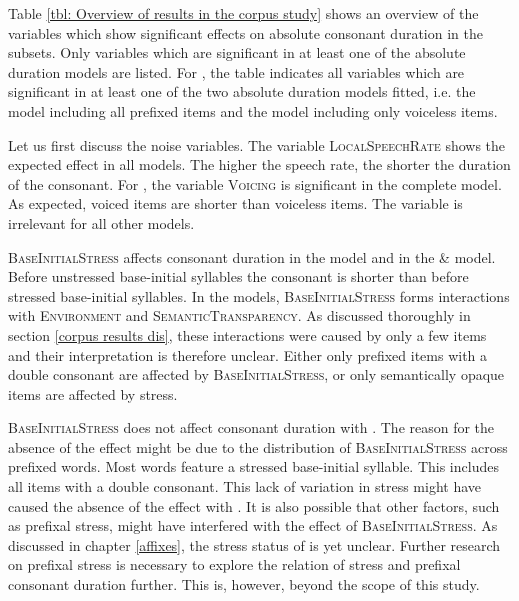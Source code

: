 Table \ref{tbl: Overview of results in the corpus study} shows an overview of the variables which show significant effects on absolute consonant duration in the subsets. Only variables which are significant in at least one of the absolute duration models are listed. For , the table indicates all variables which are significant in at least one of the two absolute duration models fitted, i.e. the model including all prefixed items and the model including only voiceless items.







Let us first discuss the noise variables. The variable \textsc{LocalSpeechRate} shows the expected effect in all models.  The higher the speech rate, the shorter the duration of the consonant. 
For , the variable \textsc{Voicing} is significant in the complete model. As expected, voiced items are shorter than voiceless items. The variable is irrelevant for all other models.

\textsc{BaseInitialStress} affects consonant duration in the model and in the  \&  model. Before unstressed base-initial syllables the consonant is shorter than before stressed base-initial syllables. 
In the models, \textsc{BaseInitialStress} forms interactions with \textsc{Environment} and \textsc{SemanticTransparency}. As discussed thoroughly in section \ref{corpus results dis}, these interactions were caused by only a few items and their interpretation is therefore unclear. Either only prefixed items with a double consonant are affected by \textsc{BaseInitialStress}, or only semantically opaque items are affected by stress.

 \textsc{BaseInitialStress} does not affect consonant duration with . The reason for the absence of the effect might be due to the distribution of \textsc{BaseInitialStress} across prefixed words. Most words feature a stressed base-initial syllable. This includes all items with a double consonant. This lack of variation in stress might have caused the absence of the effect with . It is also possible that other factors, such as prefixal stress, might have interfered with the effect of \textsc{BaseInitialStress}. As discussed in chapter \ref{affixes}, the stress status of  is yet unclear. Further research on prefixal stress is necessary to explore the relation of stress and prefixal consonant duration further. This is, however, beyond the scope of this study.

